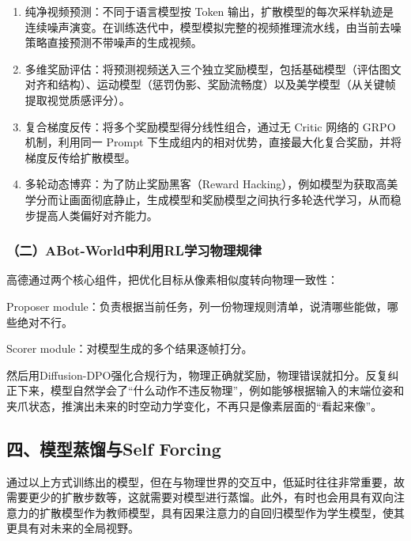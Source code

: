 \begin{enumerate}
\def\labelenumi{\arabic{enumi}.}
\item
  纯净视频预测：不同于语言模型按 Token 输出，扩散模型的每次采样轨迹是连续噪声演变。在训练迭代中，模型模拟完整的视频推理流水线，由当前去噪策略直接预测不带噪声的生成视频。
\item
  多维奖励评估：将预测视频送入三个独立奖励模型，包括基础模型（评估图文对齐和结构）、运动模型（惩罚伪影、奖励流畅度）以及美学模型（从关键帧提取视觉质感评分）。
\item
  复合梯度反传：将多个奖励模型得分线性组合，通过无 Critic 网络的 GRPO 机制，利用同一 Prompt 下生成组内的相对优势，直接最大化复合奖励，并将梯度反传给扩散模型。
\item
  多轮动态博弈：为了防止奖励黑客（Reward Hacking），例如模型为获取高美学分而让画面彻底静止，生成模型和奖励模型之间执行多轮迭代学习，从而稳步提高人类偏好对齐能力。
\end{enumerate}

\hypertarget{ux4e8cabot-worldux4e2dux5229ux7528rlux5b66ux4e60ux7269ux7406ux89c4ux5f8b}{%
\subsubsection{（二）ABot-World中利用RL学习物理规律}\label{ux4e8cabot-worldux4e2dux5229ux7528rlux5b66ux4e60ux7269ux7406ux89c4ux5f8b}}

高德通过两个核心组件，把优化目标从像素相似度转向物理一致性：

Proposer module：负责根据当前任务，列一份物理规则清单，说清哪些能做，哪些绝对不行。

Scorer module：对模型生成的多个结果逐帧打分。

然后用Diffusion-DPO强化合规行为，物理正确就奖励，物理错误就扣分。反复纠正下来，模型自然学会了``什么动作不违反物理''，例如能够根据输入的末端位姿和夹爪状态，推演出未来的时空动力学变化，不再只是像素层面的``看起来像''。

\hypertarget{ux56dbux6a21ux578bux84b8ux998fux4e0eself-forcing}{%
\subsection{四、模型蒸馏与Self Forcing}\label{ux56dbux6a21ux578bux84b8ux998fux4e0eself-forcing}}

通过以上方式训练出的模型，但在与物理世界的交互中，低延时往往非常重要，故需要更少的扩散步数等，这就需要对模型进行蒸馏。此外，有时也会用具有双向注意力的扩散模型作为教师模型，具有因果注意力的自回归模型作为学生模型，使其更具有对未来的全局视野。

